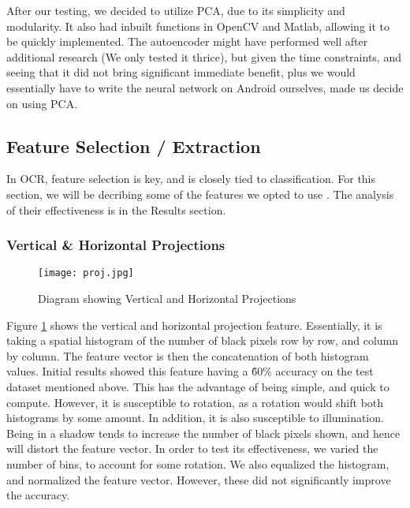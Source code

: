 After our testing, we decided to utilize PCA, due to its simplicity and modularity. It also had inbuilt functions in OpenCV and Matlab, allowing
it to be quickly implemented. The autoencoder might have performed well after additional research (We only tested it thrice), but given the time
constraints, and seeing that it did not bring significant immediate benefit, plus we would essentially have to write the neural network on Android ourselves,
made us decide on using PCA.



\subsection{Feature Selection / Extraction}
In OCR, feature selection is key, and is closely tied to classification. For this section, we will
be decribing some of the features we opted to use \cite{line, jain}. The analysis of their effectiveness is in the Results section.

\subsubsection{Vertical \& Horizontal Projections}
\begin{figure}[!]
		\texttt{[image: proj.jpg]}\\
		\caption{Diagram showing Vertical and Horizontal Projections}
		\label{fig:proj}
\end{figure}
Figure \ref{fig:proj} shows the vertical and horizontal projection feature. Essentially, it is taking a spatial
histogram of the number of black pixels row by row, and column by column. The feature vector is then the concatenation
of both histogram values. Initial results showed this feature having a \~60\% accuracy on the test dataset mentioned above.
This has the advantage of being simple, and
quick to compute. However, it is susceptible to rotation, as a rotation would shift both histograms by some amount.
In addition, it is also susceptible to illumination. Being in a shadow tends to increase the number of black pixels
shown, and hence will distort the feature vector. In order to test its effectiveness, we varied the number of bins,
to account for some rotation. We also equalized the histogram, and normalized the feature vector. However, these
did not significantly improve the accuracy.\\

